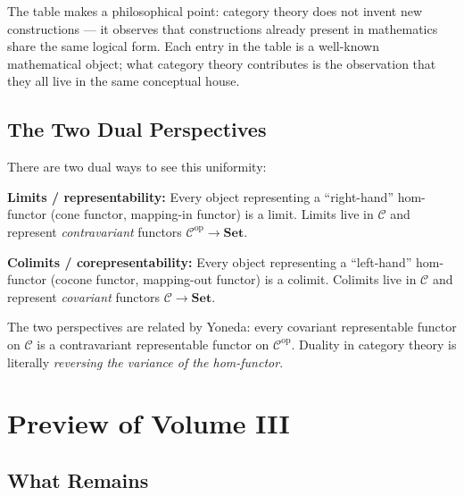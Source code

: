 \begin{dialog}
The table makes a philosophical point: category theory does not invent
new constructions --- it observes that constructions already present in
mathematics share the same logical form. Each entry in the table is a
well-known mathematical object; what category theory contributes is the
observation that they all live in the same conceptual house.
\end{dialog}

\subsection{The Two Dual Perspectives}

There are two dual ways to see this uniformity:

\textbf{Limits / representability:} Every object representing a
``right-hand'' hom-functor (cone functor, mapping-in functor) is a limit.
Limits live in $\mathcal{C}$ and represent \emph{contravariant} functors
$\mathcal{C}^{\mathrm{op}} \to \mathbf{Set}$.

\textbf{Colimits / corepresentability:} Every object representing a
``left-hand'' hom-functor (cocone functor, mapping-out functor) is a
colimit. Colimits live in $\mathcal{C}$ and represent \emph{covariant}
functors $\mathcal{C} \to \mathbf{Set}$.

The two perspectives are related by Yoneda: every covariant representable
functor on $\mathcal{C}$ is a contravariant representable functor on
$\mathcal{C}^{\mathrm{op}}$. Duality in category theory is literally
\emph{reversing the variance of the hom-functor}.


\section{Preview of Volume III}
\label{sec:vol3-preview}

\subsection{What Remains}

